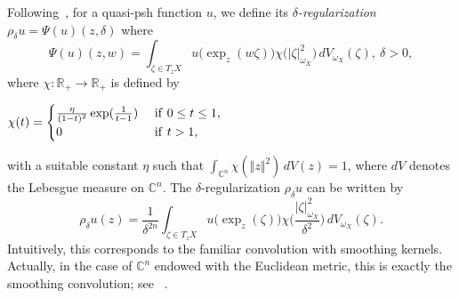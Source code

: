 \documentclass[a4paper,11pt]{amsart}
\numberwithin{equation}{section}
\theoremstyle{definition}
\begin{document}
 Following~\cite{demailly1982estimations,demailly1994regularization}, for a quasi-psh function $u$,
we define its {\em $\delta$-regularization} $\rho_\delta u=\Psi(u)(z,\delta)$ where
\begin{equation}\label{phie}
\Psi(u)(z,w)=\int_{\zeta\in T_{z}X}
u\big(\exp_z(w\zeta)\big)\chi\big({|\zeta|^2_{\omega_X }}\big)\,dV_{\omega_X}(\zeta),\ \delta>0,
\end{equation}
where $\chi: \mathbb R_{+}\rightarrow\mathbb R_{+}$ is defined by
\begin{center}
$\chi(t)=\begin{cases}\frac {\eta}{(1-t)^2}\exp(\frac 1{t-1})&\ {\rm if}\ 0\leq t\leq 1,\\0&\
	{\rm if}\ t>1,\end{cases}$
\end{center}
with a suitable constant $\eta$ such that
$\int_{\mathbb C^n}\chi(\Vert z\Vert^2)\,dV(z)=1$, where $dV$ denotes the Lebesgue measure on $\mathbb{C}^n$. The $\delta$-regularization $\rho_\delta u$ can be written by
\[\rho_\delta u(z)=\frac{1}{\delta^{2n}}\int_{\zeta\in T_{z}X}
u\big(\exp_z(\zeta)\big)\chi\bigg(\frac{|\zeta|^2_{\omega_X }}{\delta^2}\bigg)\,dV_{\omega_X}(\zeta).\]
Intuitively, this corresponds to the familiar convolution with smoothing kernels. Actually, in the case of $\mathbb{C}^n$ endowed with the Euclidean metric, this is exactly the smoothing convolution; see~
\cite[Remark 4.6]{demailly1994regularization}. 
\end{document}
